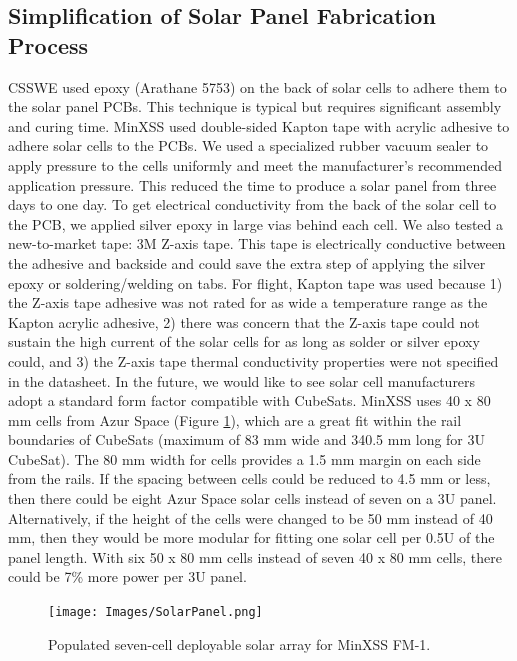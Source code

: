 \subsection{Simplification of Solar Panel Fabrication Process}
CSSWE used epoxy (Arathane 5753) on the back of solar cells to adhere them to the solar panel PCBs. This technique is typical but requires significant assembly and curing time. MinXSS used double-sided Kapton tape with acrylic adhesive to adhere solar cells to the PCBs. We used a specialized rubber vacuum sealer to apply pressure to the cells uniformly and meet the manufacturer’s recommended application pressure. This reduced the time to produce a solar panel from three days to one day. To get electrical conductivity from the back of the solar cell to the PCB, we applied silver epoxy in large vias behind each cell. We also tested a new-to-market tape: 3M Z-axis tape. This tape is electrically conductive between the adhesive and backside and could save the extra step of applying the silver epoxy or soldering/welding on tabs. For flight, Kapton tape was used because 1) the Z-axis tape adhesive was not rated for as wide a temperature range as the Kapton acrylic adhesive, 2) there was concern that the Z-axis tape could not sustain the high current of the solar cells for as long as solder or silver epoxy could, and 3) the Z-axis tape thermal conductivity properties were not specified in the datasheet.
In the future, we would like to see solar cell manufacturers adopt a standard form factor compatible with CubeSats. MinXSS uses 40 x 80 mm cells from Azur Space (Figure \ref{fig:solarpanel}), which are a great fit within the rail boundaries of CubeSats (maximum of 83 mm wide and 340.5 mm long for 3U CubeSat). The 80 mm width for cells provides a 1.5 mm margin on each side from the rails. If the spacing between cells could be reduced to 4.5 mm or less, then there could be eight Azur Space solar cells instead of seven on a 3U panel. Alternatively, if the height of the cells were changed to be 50 mm instead of 40 mm, then they would be more modular for fitting one solar cell per 0.5U of the panel length. With six 50 x 80 mm cells instead of seven 40 x 80 mm cells, there could be 7\% more power per 3U panel.

\begin{figure}[!h]
    \begin{center}
	    \texttt{[image: Images/SolarPanel.png]}
    \end{center}
    \caption[MinXSS solar panel]{
        Populated seven-cell deployable solar array for MinXSS FM-1.  
    }
    \label{fig:solarpanel}
\end{figure}


